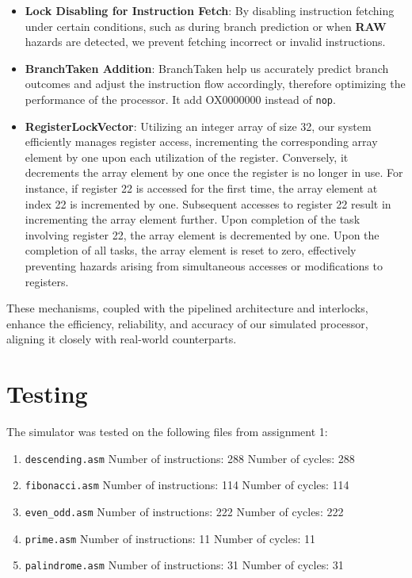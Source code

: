 \documentclass[12pt,a4paper]{article}
\begin{document}
\begin{itemize}
    \item \textbf{Lock Disabling for Instruction Fetch}: By disabling instruction fetching under certain conditions, such as during branch prediction or when \textbf{RAW} hazards are detected, we prevent fetching incorrect or invalid instructions.
    
    \item \textbf{BranchTaken Addition}: BranchTaken help us accurately predict branch outcomes and adjust the instruction flow accordingly, therefore optimizing the performance of the processor. It add OX0000000 instead of \texttt{nop}.
    
    \item \textbf{RegisterLockVector}: 
Utilizing an integer array of size 32, our system efficiently manages register access, incrementing the corresponding array element by one upon each utilization of the register. Conversely, it decrements the array element by one once the register is no longer in use. For instance, if register 22 is accessed for the first time, the array element at index 22 is incremented by one. Subsequent accesses to register 22 result in incrementing the array element further. Upon completion of the task involving register 22, the array element is decremented by one. Upon the completion of all tasks, the array element is reset to zero, effectively preventing hazards arising from simultaneous accesses or modifications to registers.
\end{itemize}

These mechanisms, coupled with the pipelined architecture and interlocks, enhance the efficiency, reliability, and accuracy of our simulated processor, aligning it closely with real-world counterparts.

\section{Testing}
The simulator was tested on the following files from assignment 1:
\begin{enumerate}
    \item \texttt{descending.asm}
        \subitem Number of instructions: 288
        \subitem Number of cycles: 288
    \item \texttt{fibonacci.asm}
        \subitem Number of instructions: 114
        \subitem Number of cycles: 114
    \item \texttt{even\_odd.asm}
        \subitem Number of instructions: 222
        \subitem Number of cycles: 222
    \item \texttt{prime.asm}
        \subitem Number of instructions: 11
        \subitem Number of cycles: 11
    \item \texttt{palindrome.asm}
        \subitem Number of instructions: 31
        \subitem Number of cycles: 31
\end{enumerate}
\end{document}

